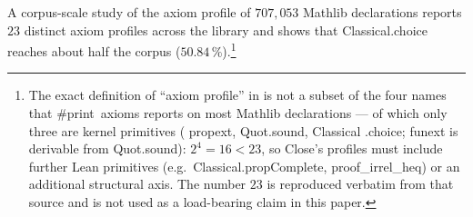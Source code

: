 \documentclass[11pt,reqno]{amsart}
\begin{document}

\noindent A corpus-scale study of the axiom profile of $707{,}053$ Mathlib
declarations \cite{close2026axiom} reports $23$ distinct axiom profiles
across the library and shows that \textsf{Classical\allowbreak.choice}
reaches about half the corpus ($50.84\,\%$).\footnote{
The exact definition of ``axiom profile'' in  \cite{close2026axiom} is not a
subset of the four names that  \textsf{\#print\ axioms} reports on most
Mathlib declarations ---  of which only three are kernel primitives (\textsf{%
propext},  \textsf{Quot\allowbreak.sound}, \textsf{Classical%
\allowbreak.choice};  \textsf{funext} is derivable from \textsf{%
Quot\allowbreak.sound}):  $2^{4}=16<23$, so Close's profiles must include
further Lean  primitives (e.g.\ \textsf{Classical\allowbreak.propComplete},  
\textsf{proof\allowbreak\_irrel\allowbreak\_heq}) or an additional 
structural axis. The number $23$ is reproduced verbatim from that  source
and is not used as a load-bearing claim in this paper.}
\end{document}
